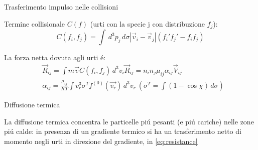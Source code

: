 \begin{frame}{Trasferimento impulso nelle collisioni}

Termine collisionale $C(f)$ (urti con la specie j con distribuzione $f_j$):
\begin{equation}
C(f_i,f_j)=\int\,d^3p_j\,d\sigma|\vec{v}_i-\vec{v}_j|(f_i'f_j'-f_if_j)
\end{equation}

La forza netta dovuta agli urti \'e:
\begin{align}
&\vec{R}_{ij}=\int m\vec{v}C(f_i,f_j)\,d^3v_i%
\vec{R}_{ij}=n_in_j\mu_{ij}\alpha_{ij}\vec{V}_{ij}\label{eq:resistance}\\
&\alpha_{ij}=\frac{\mu_{ij}}{KT}\int v_r^3\sigma^Tf^{(0)}(\vec{v_r})\,d^3v_r%
\ (\sigma^T=\int(1-\cos{\chi})\,d\sigma)%
\end{align}

\begin{block}{Diffusione termica}

La diffusione termica concentra le particelle pi\'u pesanti (e pi\'u cariche) nelle zone pi\'u calde: in presenza di un gradiente termico si ha un trasferimento netto di momento negli urti in direzione del gradiente, in \eqref{eq:resistance}%

\end{block}

\end{frame}

\begin{comment}

Considero il problema in cui le due specie hanno velocit\'a relativa media diversa da zero ma piccola rispetto alla velocit\'a termica: nel sistema in cui la prima specie ha velocit\'a media nulla la seconda ha velocit\'a $V_{ij}$ quindi la distribuzione di velocit\'a della prima \'e la distribuzione di equilibrio a temperatura T quella della seconda \'e  la distribuzione di equilibrio a temperatura T traslata di $V_{ij}$, velocit\'a di diffusione:
\begin{equation}
f_j=f_j^{(0)}+\frac{m_j}{KT}(\vec{V}_{ij}\cdot\vec{v}_j)f_j^{(0)}
\end{equation}
da cui si ottiene:
\begin{align}
&\vec{R}_{ij}=n_in_j\mu_{ij}\alpha_{ij}\vec{V}_{ij}\label{eq:resistance}\\
&\alpha_{ij}=\frac{\mu_{ij}}{KT}\int v_r^3\sigma^Tf^{(0)}(\vec{v_r})\,d^3v_r\label{eq:collisionintegral}\\ &\sigma^T=\int(1-\cos{\chi})\,d\sigma\label{eq:sigmatransport}
\end{align}

\end{comment}

